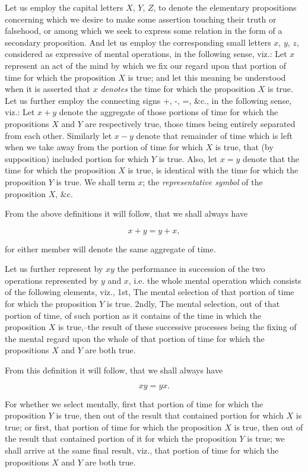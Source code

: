 \documentclass[oneside]{book}
\begin{document}
Let us employ the capital letters $X$, $Y$, $Z$, to denote the
elementary propositions concerning which we desire to make some
assertion touching their truth or falsehood, or among which we
seek to express some relation in the form of a secondary
proposition. And let us employ the corresponding small letters $x$, $y$, $z$,
considered as expressive of mental operations, in the following
sense, viz.: Let $x$ represent an act of the mind by which we fix
our regard upon that portion of time for which the proposition $X$
is true; and let this meaning be understood when it is asserted
that $x$ \textit{denotes} the time for which the proposition $X$ is true. Let
us further employ the connecting signs +, -, =, \&c., in the
following sense, viz.: Let $x+y$ denote the aggregate of those
portions of time for which the propositions $X$ and $Y$ are respectively
true, those times being entirely separated from each other.
Similarly let $x-y$ denote that remainder of time which is left when
we take away from the portion of time for which $X$ is true, that
(by supposition) included portion for which $Y$ is true. Also, let
$x=y$ denote that the time for which the proposition $X$ is true,
is identical with the time for which the proposition $Y$ is true.
We shall term $x$; the \textit{representative symbol} of the proposition $X$, \&c.

From the above definitions it will follow, that we shall
always have

\[
x + y = y + x,
\]

for either member will denote the same aggregate of time.

Let us further represent by $xy$ the performance in succession
of the two operations represented by $y$ and $x$, i.e. the whole
mental operation which consists of the following elements, viz.,
1st, The mental selection of that portion of time for which the
proposition $Y$ is true. 2ndly, The mental selection, out of that
portion of time, of such portion as it contains of the time in
which the proposition $X$ is true,--the result of these successive
processes being the fixing of the mental regard upon the whole
of that portion of time for which the propositions $X$ and $Y$ are
both true.

From this definition it will follow, that we shall always have

\begin{equation}
xy = yx.
\end{equation}

For whether we select mentally, first that portion of time for
which the proposition $Y$ is true, then out of the result that
contained portion for which $X$ is true; or first, that portion of time
for which the proposition $X$ is true, then out of the result that
contained portion of it for which the proposition $Y$ is true; we
shall arrive at the same final result, viz., that portion of time for
which the propositions $X$ and $Y$ are both true.
\end{document}
